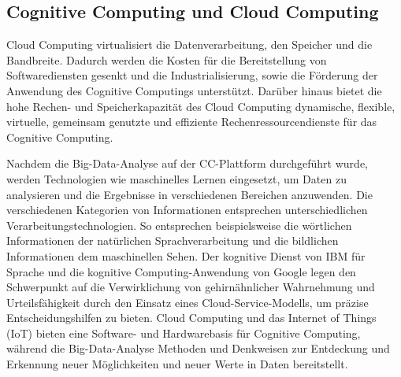 \subsection{Cognitive Computing und Cloud Computing}

Cloud Computing virtualisiert die Datenverarbeitung, den Speicher und die Bandbreite. Dadurch werden die Kosten für die Bereitstellung von Softwarediensten gesenkt und die Industrialisierung, sowie die Förderung der Anwendung des Cognitive Computings unterstützt. Darüber hinaus bietet die hohe Rechen- und Speicherkapazität des Cloud Computing dynamische, flexible, virtuelle, gemeinsam genutzte und effiziente Rechenressourcendienste für das Cognitive Computing.

Nachdem die Big-Data-Analyse auf der CC-Plattform durchgeführt wurde, werden Technologien wie maschinelles Lernen eingesetzt, um Daten zu analysieren und die Ergebnisse in verschiedenen Bereichen anzuwenden. Die verschiedenen Kategorien von Informationen entsprechen unterschiedlichen Verarbeitungstechnologien. So entsprechen beispielsweise die wörtlichen Informationen der natürlichen Sprachverarbeitung und die bildlichen Informationen dem maschinellen Sehen. Der kognitive Dienst von IBM für Sprache und die kognitive Computing-Anwendung von Google legen den Schwerpunkt auf die Verwirklichung von gehirnähnlicher Wahrnehmung und Urteilsfähigkeit durch den Einsatz eines Cloud-Service-Modells, um präzise Entscheidungshilfen zu bieten. Cloud Computing und das Internet of Things (IoT) bieten eine Software- und Hardwarebasis für Cognitive Computing, während die Big-Data-Analyse Methoden und Denkweisen zur Entdeckung und Erkennung neuer Möglichkeiten und neuer Werte in Daten bereitstellt.
